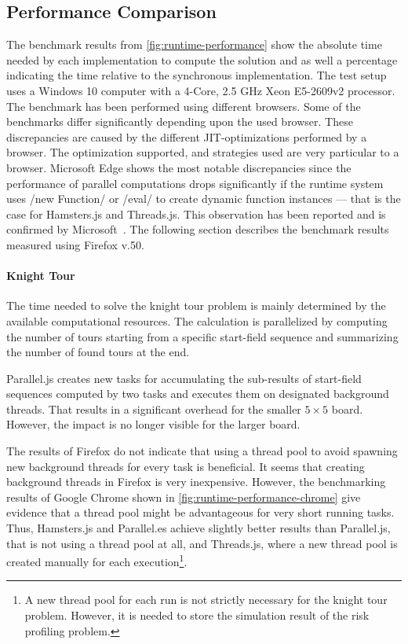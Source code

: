 \subsection{Performance Comparison}
The benchmark results from \cref{fig:runtime-performance} show the absolute time needed by each implementation to compute the solution and as well a percentage indicating the time relative to the synchronous implementation. The test setup uses a Windows 10 computer with a 4-Core, 2.5 GHz Xeon E5-2609v2 processor. The benchmark has been performed using different browsers. Some of the benchmarks differ significantly depending upon the used browser. These discrepancies are caused by the different JIT-optimizations performed by a browser. The optimization supported, and strategies used are very particular to a browser. Microsoft Edge shows the most notable discrepancies since the performance of parallel computations drops significantly if the runtime system uses \javascriptinline/new Function/ or \javascriptinline/eval/ to create dynamic function instances --- that is the case for Hamsters.js and Threads.js. This observation has been reported and is confirmed by Microsoft~\cite{newFunctionWebWorkerEdge}. The following section describes the benchmark results measured using Firefox v.50. 

\begin{figure*}
		
	\caption{Runtime Performance of Parallelization Problems Relative to Synchronous Execution}
	\label{fig:runtime-performance}
\end{figure*}


\paragraph{Knight Tour} The time needed to solve the knight tour problem is mainly determined by the available computational resources. The calculation is parallelized by computing the number of tours starting from a specific start-field sequence and summarizing the number of found tours at the end. 

Parallel.js creates new tasks for accumulating the sub-results of start-field sequences computed by two tasks and executes them on designated background threads. That results in a significant overhead for the smaller $5\times5$ board. However, the impact is no longer visible for the larger board.

The results of Firefox do not indicate that using a thread pool to avoid spawning new background threads for every task is beneficial. It seems that creating background threads in Firefox is very inexpensive. However, the benchmarking results of Google Chrome shown in \cref{fig:runtime-performance-chrome} give evidence that a thread pool might be advantageous for very short running tasks. Thus, Hamsters.js and Parallel.es achieve slightly better results than Parallel.js, that is not using a thread pool at all, and Threads.js, where a new thread pool is created manually for each execution\footnote{A new thread pool for each run is not strictly necessary for the knight tour problem. However, it is needed to store the simulation result of the risk profiling problem.}. 

